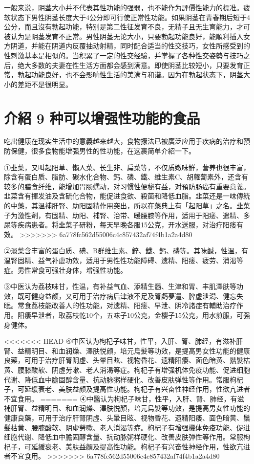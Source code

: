 \documentclass[12pt,UTF8]{ctexbook}
\begin{document}
一般来说，阴茎大小并不代表其性功能的强弱，也不能作为評價性能力的標准。疲软状态下男性阴茎长度大于4公分即可行使正常性功能。如果阴茎在青春期后短于4公分，而且沒有勃起功能，特別是第二性征发育不良，无精子且无生育能力，才可被认为是阴茎发育不正常。男性阴茎无论大小，只要勃起功能良好，能順利插入女方阴道，并能在阴道内反覆抽动射精，同时配合适当的性交技巧，女性所感受到的性刺激基本是相似的。当积累了一定的性交经驗，并掌握了各种性交姿勢与技巧之后，绝大多数的夫妻在性生活方面都会感到满意。即使阴茎比较短小，只要发育正常，勃起功能良好，也不会影响性生活的美满与和谐。因为在勃起状态下，阴茎大小的差距不是很明显。

\section{介紹 9 种可以增强性功能的食品}

吃出健康在现实生活中的意義越来越大，食物撩法已被廣泛应用于疾病的治疗和預防保健，很多食物能增强男性的性功能，在这裹简单介紹一下。

①韭菜，又叫起阳草、懶人菜、长生非、扁菜等，不仅质嫩味鮮，营养也很丰富，除含有蛋白质、脂肪、碳水化合物、鈣、磷、鐵、维生素C、胡蘿蔔素外，还含有较多的膳食纤维，能增加胃肠蠕动，对习惯性便秘有益，对預防肠癌有重要意義。韭菜含有揮发油及含硫化合物，能促进食欲、殺菌和降低血脂。韭菜还是一味傳統的中藥，其温補肝腎、助阳固精作用突出，所以在藥典上有「起阳草」之名。韭菜子为激性劑，有固精、助阳、補腎、治带、暖腰膝等作用，适用于阳痿、遣精、多尿等疾病患者。将韭菜子研粉，每天早晚各服15公克，开水送服，对治疗阳痿有效。
>>>>>>> 6a778fc562d55006c4c857432af74f4b1a2a4d80

②淡菜含丰富的蛋白质、碘、B群维生素、鋅、鐵、鈣、磷等。其味鹹，性温，有温腎固精、益气补虚功效，适用于男性性功能障碍、遗精、阳痿、疲劳、消渴等症。男性常食可强壮身体，增强性功能。

③中医认为荔枝味甘，性温，有补益气血、添精生髓、生津和胃、丰肌澤肤等功效，既可健身益颜，又可用于治疗病后津液不足及腎虧夢遣、脾虚泄潟、健忘失眠。常食荔枝能改善人的性功能，对遗精、阳痿、早泄、阴冷諸症有輔助治疗作用。阳痿早泄者，取荔枝乾10个，五味子10公克，金樱子15公克，用水煎服，可强身健体。

<<<<<<< HEAD
④中医认为枸杞子味甘，性平，入肝、腎、肺经，有滋补肝腎、益精明目、和血润燥、澤肤悦颜，培元烏髮等功效，是提高男女性功能的健康良藥，可用于治疗肝腎阴虛、头暈目眩、视物昏花、遗精阳痿、面色暗黄、鬚髮枯黄、腰膝酸软、阴虛劳嗽、老人消渴等症。枸杞子有增强机体免疫功能、促进细胞代谢、降低血中膽固醇含量、抗动脉粥样硬化、改善皮肤弹性等作用。常服枸杞子，可延缓衰老、美肤益颜及提高性功能。枸杞子有兴奋性神经作用，性欲亢进者不宜食用。
=======
④中醫认为枸杞子味甘，性平，入肝、腎、肺经，有滋補肝腎、益精明目、和血润燥、澤肤悦顏，培元烏髮等功效，是提高男女性功能的健康良藥，可用于治疗肝腎阴虛、头暈目眩、视物昏花、遗精阳痿、面色暗黄、鬚髮枯黄、腰膝酸软、阴虛勞嗽、老人消渴等症。枸杞子有增强機体免疫功能、促进细胞代谢、降低血中膽固醇含量、抗动脉粥样硬化、改善皮肤弹性等作用。常服枸杞子，可延緩衰老、美肤益顏及提高性功能。枸杞子有兴奋性神经作用，性欲亢进者不宜食用。
>>>>>>> 6a778fc562d55006c4c857432af74f4b1a2a4d80
\end{document}
